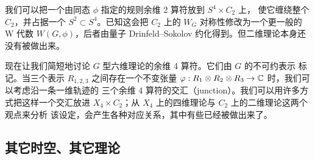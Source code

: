 我们可以把一个由同态 $\phi$ 指定的规则余维 2 算符放到 $S^4\times C_2$ 上，
使它缠绕整个 $C_2$，并占据一个 $S^2\subset S^4$。已知这会把 $C_2$
上的 $W_G$ 对称性修改为一个更一般的 W 代数 $W(G,\phi)$，后者由量子
Drinfeld--Sokolov 约化得到。但二维理论本身还没有被做出来。


现在让我们简短地讨论 $G$ 型六维理论的余维 4 算符。它们由 $G$ 的不可约表示
标记。当三个表示 $R_{1,2,3}$ 之间存在一个不变张量
$\varphi: R_1\otimes R_2\otimes R_3\to\mathbb{C}$ 时，我们可以考虑沿一条一维轨迹的
三个余维 4 算符的交汇（junction）。我们可以用许多方式把这样一个交汇放进
$X_4\times C_2$；从 $X_4$ 上的四维理论与 $C_2$ 上的二维理论这两个观点来分析
该设定，会产生各种对应关系，其中有些已经被做出来了。


\subsection{其它时空、其它理论}

